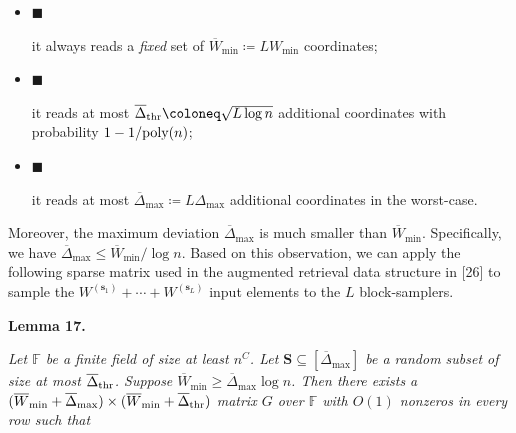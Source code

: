 \begin{itemize}


\item[] 
$\blacksquare$ 


it always reads a \emph{fixed} set of $\overline{W}_{\min}\coloneq LW_{\min}$ coordinates;\par





\item[] 
$\blacksquare$ 


it reads at most $\overline{\Delta}_{{\rm thr}}\coloneq\sqrt{L\log n}$ additional coordinates with probability $1-1/\textnormal{poly}(n)$;\par





\item[] 
$\blacksquare$ 


it reads at most $\overline{\Delta}_{\max}\coloneq L\Delta_{\max}$ additional coordinates in the worst-case.\par





\end{itemize}


Moreover, the maximum deviation $\overline{\Delta}_{\max}$ is much smaller than $\overline{W}_{\min}$.
Specifically, we have $\overline{\Delta}_{\max}\leq\overline{W}_{\min}/\log n$.
Based on this observation, we can apply the following sparse matrix used in the augmented retrieval data structure in [26] to sample the $W^{(\boldsymbol{s}_{1})}+\cdots+W^{(\boldsymbol{s}_{L})}$ input elements to the $L$ block-samplers.\par





\par\medskip\noindent\textbf{
\textbf{Lemma 17}\textbf{.}
}\par



\emph{Let $\mathbb{F}$ be a finite field of size at least $n^{C}$.
Let $\boldsymbol{S}\subseteq[\overline{\Delta}_{\max}]$ be a random subset of size at most $\overline{\Delta}_{{\rm thr}}$.
Suppose $\overline{W}_{\min}\geq\overline{\Delta}_{\max}\log n$.
Then there exists a $(\overline{W}_{\min}+\overline{\Delta}_{\max})\times(\overline{W}_{\min}+\overline{\Delta}_{{\rm thr}})$ matrix $G$ over $\mathbb{F}$ with $O(1)$ nonzeros in every row such that}\par


